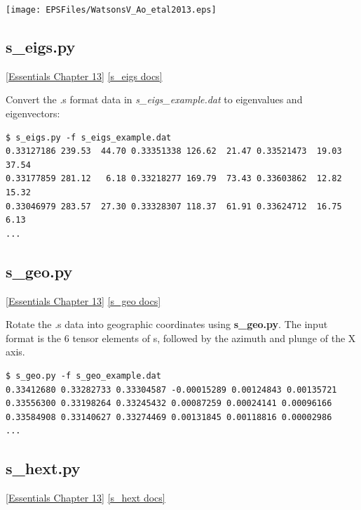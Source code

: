 \documentclass[11pt]{book}
\begin{document}
{{{\texttt{[image: EPSFiles/WatsonsV\_Ao\_etal2013.eps]}


\subsection{s\_eigs.py}
\href{http://earthref.org/MAGIC/books/Tauxe/Essentials/WebBook3ch13.html#ch13}{[Essentials Chapter 13]}
\href{https://github.com/PmagPy/PmagPy/blob/master/programs/s_eigs.py}{[s\_eigs docs]}

Convert the .s format data in {\it s\_eigs\_example.dat} to eigenvalues and eigenvectors:

\begin{verbatim}
$ s_eigs.py -f s_eigs_example.dat
0.33127186 239.53  44.70 0.33351338 126.62  21.47 0.33521473  19.03  37.54
0.33177859 281.12   6.18 0.33218277 169.79  73.43 0.33603862  12.82  15.32
0.33046979 283.57  27.30 0.33328307 118.37  61.91 0.33624712  16.75   6.13
...
\end{verbatim}


\subsection{s\_geo.py}
\href{http://earthref.org/MAGIC/books/Tauxe/Essentials/WebBook3ch13.html#ch13}{[Essentials Chapter 13]}
\href{https://github.com/PmagPy/PmagPy/blob/master/programs/s_geo.py}{[s\_geo docs]}

Rotate the .s data into geographic coordinates using {\bf s\_geo.py}.  The input format is the 6 tensor elements of s, followed by the azimuth and plunge of the X axis.

\begin{verbatim}
$ s_geo.py -f s_geo_example.dat
0.33412680 0.33282733 0.33304587 -0.00015289 0.00124843 0.00135721
0.33556300 0.33198264 0.33245432 0.00087259 0.00024141 0.00096166
0.33584908 0.33140627 0.33274469 0.00131845 0.00118816 0.00002986
...
\end{verbatim}


\subsection{s\_hext.py}
\href{http://earthref.org/MAGIC/books/Tauxe/Essentials/WebBook3ch13.html#ch13}{[Essentials Chapter 13]}
\href{https://github.com/PmagPy/PmagPy/blob/master/programs/s_hext.py}{[s\_hext docs]}


}}}
\end{document}
